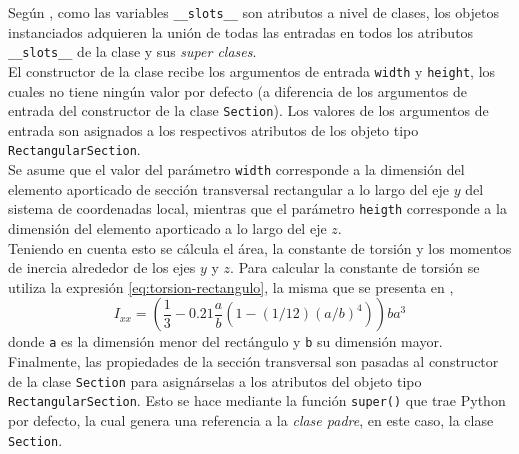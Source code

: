 Según \cite{lutz2013python}, como las variables \verb|__slots__| son atributos a nivel de clases, los objetos instanciados adquieren la unión de todas las entradas en todos los atributos \verb|__slots__| de la clase y sus \emph{super clases}.\\

El constructor de la clase recibe los argumentos de entrada \verb|width| y \verb|height|, los cuales no tiene ningún valor por defecto (a diferencia de los argumentos de entrada del constructor de la clase \verb|Section|). Los valores de los argumentos de entrada son asignados a los respectivos atributos de los objeto tipo \verb|RectangularSection|.\\

Se asume que el valor del parámetro \verb|width| corresponde a la dimensión del elemento aporticado de sección transversal rectangular a lo largo del eje $ y $ del sistema de coordenadas local, mientras que el parámetro \verb|heigth| corresponde a la dimensión del elemento aporticado a lo largo del eje $ z $.\\

Teniendo en cuenta esto se cálcula el área, la constante de torsión y los momentos de inercia alrededor de los ejes $ y $ y $ z $. Para calcular la constante de torsión se utiliza la expresión \eqref{eq:torsion-rectangulo}, la misma que se presenta en \cite{escamilla1995microcomputadores},\\

\begin{equation}
  \label{eq:torsion-rectangulo}
  I_{xx} = \left(\frac{1}{3} - 0.21 \frac{a}{b} \left(1 - (1 / 12) (a / b)^4\right)\right) b a ^ 3
\end{equation}
donde \verb|a| es la dimensión menor del rectángulo y \verb|b| su dimensión mayor.\\

Finalmente, las propiedades de la sección transversal son pasadas al constructor de la clase \verb|Section| para asignárselas a los atributos del objeto tipo \verb|RectangularSection|. Esto se hace mediante la función \verb|super()| que trae Python por defecto, la cual genera una referencia a la \emph{clase padre}, en este caso, la clase \verb|Section|.\\

